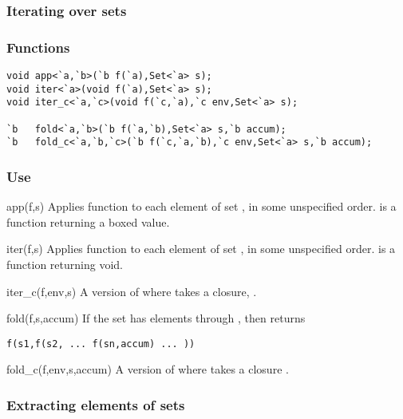 \subsubsection*{Iterating over sets}
\subsubsection*{Functions}
\begin{verbatim}
void app<`a,`b>(`b f(`a),Set<`a> s);
void iter<`a>(void f(`a),Set<`a> s);
void iter_c<`a,`c>(void f(`c,`a),`c env,Set<`a> s);

`b   fold<`a,`b>(`b f(`a,`b),Set<`a> s,`b accum);
`b   fold_c<`a,`b,`c>(`b f(`c,`a,`b),`c env,Set<`a> s,`b accum);
\end{verbatim}

\subsubsection*{Use}

\begin{defun}{app}{(f,s)}
Applies function  to each element of set , in some
unspecified order.   is a function returning a boxed value.
\end{defun}

\begin{defun}{iter}{(f,s)}
Applies function  to each element of set , in some
unspecified order.   is a function returning void.
\end{defun}

\begin{defun}{iter_c}{(f,env,s)}
A version of  where  takes a closure, .
\end{defun}

\begin{defun}{fold}{(f,s,accum)}
If the set  has elements  through , then
 returns
\begin{verbatim}
f(s1,f(s2, ... f(sn,accum) ... ))
\end{verbatim}
\end{defun}

\begin{defun}{fold_c}{(f,env,s,accum)}
A version of  where  takes a closure .
\end{defun}

\subsubsection*{Extracting elements of sets}
